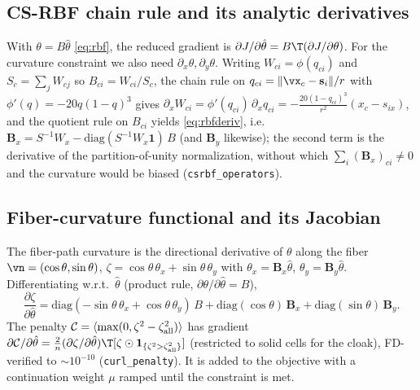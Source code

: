 \subsection{CS-RBF chain rule and its analytic derivatives}
With $\theta=B\hat\theta$ \eqref{eq:rbf}, the reduced gradient is
$\partial J/\partial\hat\theta=B\T(\partial J/\partial\theta)$. For the curvature
constraint we also need $\partial_x\theta,\partial_y\theta$. Writing
$W_{ci}=\phi(q_{ci})$ and $S_c=\sum_jW_{cj}$ so $B_{ci}=W_{ci}/S_c$, the chain rule
on $q_{ci}=\lVert\vx_c-\mathbf s_i\rVert/r$ with $\phi'(q)=-20q(1-q)^3$ gives
$\partial_x W_{ci}=\phi'(q_{ci})\,\partial_x q_{ci}
=-\tfrac{20(1-q_{ci})^3}{r^2}(x_c-s_{ix})$, and the quotient rule on $B_{ci}$
yields \eqref{eq:rbfderiv}, i.e.\ $\mathbf B_x=S^{-1}W_x-\mathrm{diag}(S^{-1}W_x
\mathbf 1)\,B$ (and $\mathbf B_y$ likewise); the second term is the derivative of
the partition-of-unity normalization, without which $\sum_i(\mathbf B_x)_{ci}\neq0$
and the curvature would be biased (\texttt{csrbf\_operators}).

\subsection{Fiber-curvature functional and its Jacobian}
The fiber-path curvature is the directional derivative of $\theta$ along the fiber
$\vn=(\cos\theta,\sin\theta)$,
$\zeta=\cos\theta\,\theta_x+\sin\theta\,\theta_y$ with $\theta_x=\mathbf
B_x\hat\theta$, $\theta_y=\mathbf B_y\hat\theta$. Differentiating w.r.t.\
$\hat\theta$ (product rule, $\partial\theta/\partial\hat\theta=B$),
\begin{equation}
  \frac{\partial\zeta}{\partial\hat\theta}
  =\mathrm{diag}(-\sin\theta\,\theta_x+\cos\theta\,\theta_y)\,B
  +\mathrm{diag}(\cos\theta)\,\mathbf B_x+\mathrm{diag}(\sin\theta)\,\mathbf B_y .
\end{equation}
The penalty $\mathcal C=\langle\max(0,\zeta^2-\zeta_{\rm all}^2)\rangle$ has gradient
$\partial\mathcal C/\partial\hat\theta=\tfrac{2}{n}(\partial\zeta/\partial\hat\theta)\T
[\zeta\odot\mathbf 1_{\{\zeta^2>\zeta_{\rm all}^2\}}]$ (restricted to solid cells
for the cloak), FD-verified to $\sim\!10^{-10}$ (\texttt{curl\_penalty}). It is
added to the objective with a continuation weight $\mu$ ramped until the
constraint is met.

